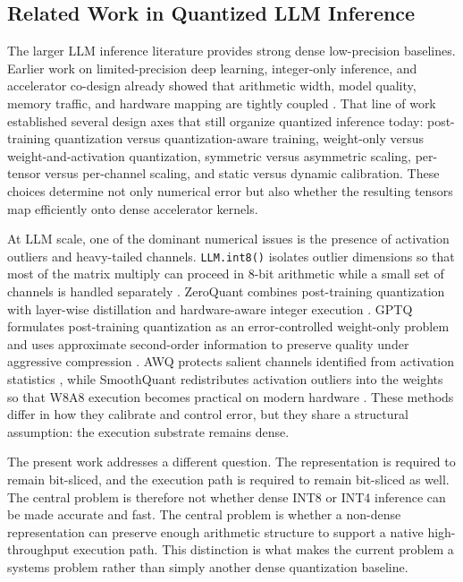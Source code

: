 \subsection{Related Work in Quantized LLM Inference}
The larger LLM inference literature provides strong dense low-precision baselines. Earlier work on limited-precision deep learning, integer-only inference, and accelerator co-design already showed that arithmetic width, model quality, memory traffic, and hardware mapping are tightly coupled \cite{gupta2015limitedprecision,jacob2018quantization,lee2018unpu,mishra2020survey}. That line of work established several design axes that still organize quantized inference today: post-training quantization versus quantization-aware training, weight-only versus weight-and-activation quantization, symmetric versus asymmetric scaling, per-tensor versus per-channel scaling, and static versus dynamic calibration. These choices determine not only numerical error but also whether the resulting tensors map efficiently onto dense accelerator kernels.

At LLM scale, one of the dominant numerical issues is the presence of activation outliers and heavy-tailed channels. \texttt{LLM.int8()} isolates outlier dimensions so that most of the matrix multiply can proceed in 8-bit arithmetic while a small set of channels is handled separately \cite{llmint8}. ZeroQuant combines post-training quantization with layer-wise distillation and hardware-aware integer execution \cite{zeroquant}. GPTQ formulates post-training quantization as an error-controlled weight-only problem and uses approximate second-order information to preserve quality under aggressive compression \cite{gptq}. AWQ protects salient channels identified from activation statistics \cite{awq}, while SmoothQuant redistributes activation outliers into the weights so that W8A8 execution becomes practical on modern hardware \cite{smoothquant}. These methods differ in how they calibrate and control error, but they share a structural assumption: the execution substrate remains dense.

The present work addresses a different question. The representation is required to remain bit-sliced, and the execution path is required to remain bit-sliced as well. The central problem is therefore not whether dense INT8 or INT4 inference can be made accurate and fast. The central problem is whether a non-dense representation can preserve enough arithmetic structure to support a native high-throughput execution path. This distinction is what makes the current problem a systems problem rather than simply another dense quantization baseline.

